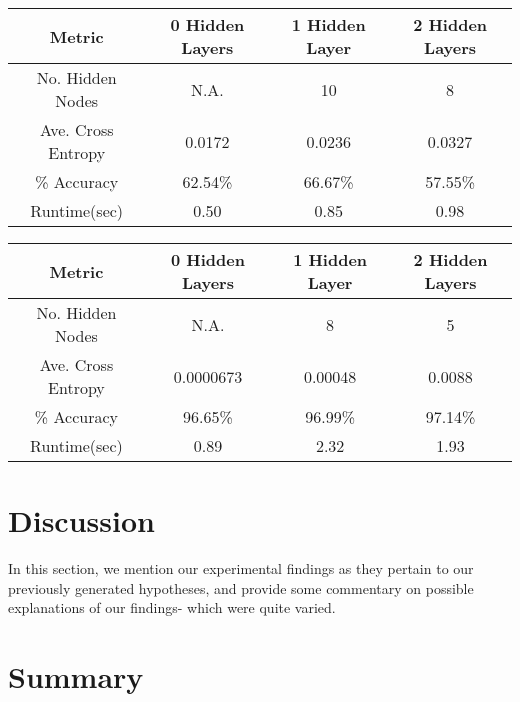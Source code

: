 \documentclass[twoside,11pt]{article}
\begin{document}
\begin{center}
	\begin{tabular}{|c c c c|}
		\hline
		Metric & 0 Hidden Layers & 1 Hidden Layer & 2 Hidden Layers \\ [0.5ex]
		\hline \hline
		No. Hidden Nodes & N.A. & 10 & 8 \\
		\hline
		Ave. Cross Entropy & 0.0172 & 0.0236 & 0.0327 \\
		\hline
		\% Accuracy & 62.54\% & 66.67\% & 57.55\% \\
		\hline
		Runtime(sec) & 0.50 & 0.85 & 0.98 \\
		\hline
	\end{tabular}
\end{center}

\begin{center}
	\begin{tabular}{|c c c c|}
		\hline
		Metric & 0 Hidden Layers & 1 Hidden Layer & 2 Hidden Layers \\ [0.5ex]
		\hline \hline
		No. Hidden Nodes & N.A. & 8 & 5 \\
		\hline
		Ave. Cross Entropy & 0.0000673 & 0.00048 & 0.0088 \\
		\hline
		\% Accuracy & 96.65\% & 96.99\% & 97.14\% \\
		\hline
		Runtime(sec) & 0.89 & 2.32 & 1.93 \\
		\hline
	\end{tabular}
\end{center}
\section{Discussion}

In this section, we mention our experimental findings as they pertain to our previously generated hypotheses,
and provide some commentary on possible explanations of our findings- which were quite varied.


\section{Summary}
\end{document}
